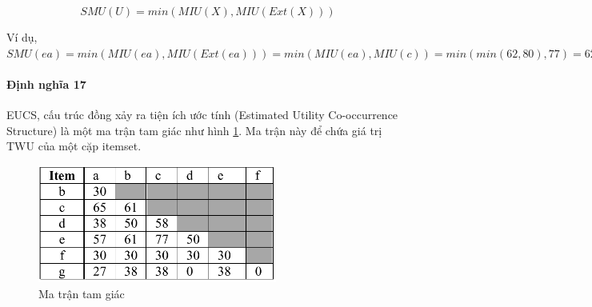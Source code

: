 $$ SMU(U) = min(MIU(X), MIU(Ext(X))) $$

Ví dụ, $SMU(ea) = min(MIU(ea), MIU(Ext(ea))) = min (MIU(ea), MIU(c)) = min(min(62, 80), 77) = 62$

\paragraph{Định nghĩa 17} EUCS, cấu trúc đồng xảy ra tiện ích ước tính (Estimated Utility Co-occurrence Structure) \cite{fournier2014fhm} là một ma trận tam giác như hình \ref{fig:eucs}. Ma trận này để chứa giá trị TWU của một cặp itemset. 

\begin{figure}[h]
\centering
\includegraphics[width=0.7\textwidth]{image/fig/trianglematrix.PNG}
\caption{\label{fig:eucs} Ma trận tam giác  }
\end{figure}